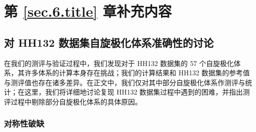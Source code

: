 
\section{第 \ref{sec.6.title} 章补充内容}

\subsection{对 HH132 数据集自旋极化体系准确性的讨论}
\label{sec.6.supp-HH132-remove}

在我们的测评与验证过程中，我们发现对于 HH132 数据集\cite{Hait-Head-Gordon.PCCP.2018}的 57 个自旋极化体系，其许多体系的计算本身存在挑战；我们的计算结果和 HH132 数据集的参考值与测评值也存在诸多差异。在正文中，我们仅对其中部分自旋极化体系作测评与统计；在这里，我们将详细地讨论复现 HH132 数据集过程中遇到的困难，并指出测评过程中剔除部分自旋极化体系的具体原因。

\subsubsection{对称性破缺}

